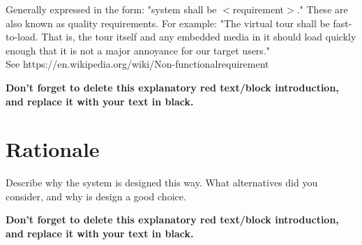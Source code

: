 \begin{tcolorbox}[      %
    boxrule=0pt,        %
    colback=white,      %
    coltext=red         %
]                       %
    Generally expressed in the form: "system shall be $<$requirement$>$." These are also known as quality requirements. For example: 
    "The virtual tour shall be fast-to-load. That is, the tour itself and any embedded media in it should load quickly enough that it is not a major annoyance for our target users." \\
    See https://en.wikipedia.org/wiki/Non-functional\textunderscore requirement
    
    \vspace{15pt}       %
    \begin{center}      %
    \textbf{Don't forget to delete this explanatory red text/block introduction, and replace it with your text in black.}
    \end{center}        %
\end{tcolorbox}         %

\section{Rationale} %

\begin{tcolorbox}[      %
    boxrule=0pt,        %
    colback=white,      %
    coltext=red         %
]                       %
    Describe why the system is designed this way. What alternatives did you consider, and why is design a good choice.
    
    \vspace{15pt}       %
    \begin{center}      %
    \textbf{Don't forget to delete this explanatory red text/block introduction, and replace it with your text in black.}
    \end{center}        %
\end{tcolorbox}         %